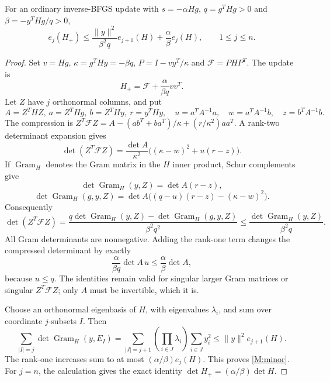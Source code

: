 \begin{theorem}\label{M:hierarchy}
For an ordinary inverse-BFGS update with $s=-\alpha Hg$, $q=g^THg>0$ and $\beta=-y^THg/q>0$,
\begin{equation}\label{M:minor}
 e_j(H_+)\le \frac{\|y\|^2}{\beta^2q}e_{j+1}(H)+\frac\alpha\beta e_j(H),\qquad1\le j\le n.
\end{equation}
\end{theorem}
\begin{proof}
Set $v=Hg$, $\kappa=g^THy=-\beta q$, $P=I-vy^T/\kappa$ and $\mathcal F=PHP^T$. The update is
\[
 H_+=\mathcal F+\frac{\alpha}{\beta q}vv^T.
\]
Let $Z$ have $j$ orthonormal columns, and put
\[
 A=Z^THZ,\ a=Z^THg,\ b=Z^THy,\ r=y^THy,
 \quad u=a^TA^{-1}a,\quad w=a^TA^{-1}b,\quad z=b^TA^{-1}b.
\]
The compression is $Z^T\mathcal FZ=A-(ab^T+ba^T)/\kappa+(r/\kappa^2)aa^T$. A rank-two determinant expansion gives
\[
 \det(Z^T\mathcal FZ)=\frac{\det A}{\kappa^2}\bigl((\kappa-w)^2+u(r-z)\bigr).
\]
If $\operatorname{Gram}_H$ denotes the Gram matrix in the $H$ inner product, Schur complements give
\[
 \det\operatorname{Gram}_H(y,Z)=\det A(r-z),
\]
\[
 \det\operatorname{Gram}_H(g,y,Z)
 =\det A\bigl((q-u)(r-z)-(\kappa-w)^2\bigr).
\]
Consequently
\begin{equation}\label{M:compression}
 \det(Z^T\mathcal FZ)
 =\frac{q\det\operatorname{Gram}_H(y,Z)-\det\operatorname{Gram}_H(g,y,Z)}{\beta^2q^2}
 \le\frac{\det\operatorname{Gram}_H(y,Z)}{\beta^2q}.
\end{equation}
All Gram determinants are nonnegative. Adding the rank-one term changes the compressed determinant by exactly
\[
 \frac{\alpha}{\beta q}\det A\,u\le\frac\alpha\beta\det A,
\]
because $u\le q$. The identities remain valid for singular larger Gram matrices or singular $Z^T\mathcal FZ$; only $A$ must be invertible, which it is.

Choose an orthonormal eigenbasis of $H$, with eigenvalues $\lambda_i$, and sum over coordinate $j$-subsets $I$. Then
\[
 \sum_{|I|=j}\det\operatorname{Gram}_H(y,E_I)
 =\sum_{|J|=j+1}\left(\prod_{i\in J}\lambda_i\right)\sum_{i\in J}y_i^2
 \le\|y\|^2e_{j+1}(H).
\]
The rank-one increases sum to at most $(\alpha/\beta)e_j(H)$. This proves \eqref{M:minor}. For $j=n$, the calculation gives the exact identity $\det H_+=(\alpha/\beta)\det H$.
\end{proof}

